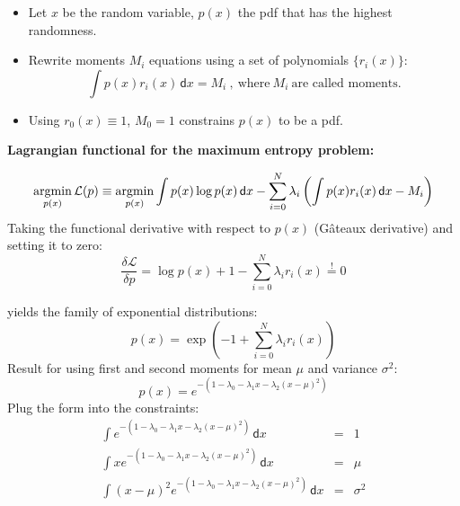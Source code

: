   \begin{itemize}
    \item Let $x$ be the random variable, $p(x)$ the pdf that has the highest randomness. \item Rewrite moments $M_i$ equations using a set of polynomials $\{ r_i(x) \}$:
      \begin{displaymath}
        \int p(x) r_i(x) \,\mathsf{d}x = M_i ~,~\mbox{where}~M_i~\mbox{are called moments}. \end{displaymath} 
    \item Using $r_0(x) \equiv 1$, $M_0 = 1$ constrains $p(x)$ to be a pdf.
  \end{itemize}
 
 \textbf{Lagrangian functional for the maximum entropy problem:}

  {\small
  \begin{displaymath}
    \operatorname*{argmin}_{p(x)} \mathcal L(p) \equiv 
    \operatorname*{argmin}_{p(x)} \int p(x) \log p(x) \,\mathsf{d}x - \sum_{i = 0}^N \lambda_i \left( \int p(x) r_i(x) \,\mathsf{d}x - M_i \right)
  \end{displaymath}
  }
  Taking the functional derivative with respect to $p(x)$ (G\^{a}teaux derivative) and setting it to zero:
%
  {\small
  \begin{displaymath}
    \frac{\delta \mathcal L}{\delta p} = \log p(x) + 1 - \sum_{i=0}^N \lambda_i r_i(x) \stackrel{!}{=} 0
  \end{displaymath}
  }
              
%  
  yields the family of exponential distributions:
%
  {\small
  \begin{displaymath}
    p(x) = \exp \left( -1 + \sum_{i=0}^N \lambda_i r_i(x) \right)
  \end{displaymath}
  } 
  Result for using first and second moments for mean $\mu$ and variance $\sigma^2$:
  \begin{displaymath}
    p(x) = e^{-(1 - \lambda_0 - \lambda_1 x - \lambda_2 (x-\mu)^2)}
  \end{displaymath}
  Plug the form into the constraints:
  \begin{eqnarray*}
    \int e^{-(1 - \lambda_0 - \lambda_1 x - \lambda_2 (x-\mu)^2)} \,\mathsf{d}x &=& 1 \\
    \int x e^{-(1 - \lambda_0 - \lambda_1 x - \lambda_2 (x-\mu)^2)} \,\mathsf{d}x &=& \mu \\
    \int (x-\mu)^2 e^{-(1 - \lambda_0 - \lambda_1 x - \lambda_2 (x-\mu)^2)} \,\mathsf{d}x &=& \sigma^2
  \end{eqnarray*}
 
